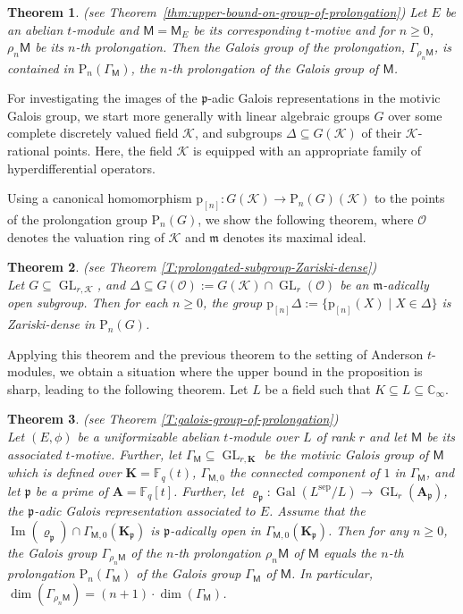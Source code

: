 \documentclass[10pt,a4paper]{amsart}
\theoremstyle{plain} %
\newtheorem{maintheorem}{Theorem}
\theoremstyle{definition}
\theoremstyle{remark}
\newcommand{\CC}{\mathbb{C}}
\newcommand{\FF}{\mathbb{F}}
\newcommand{\cK}{\mathcal{K}}   %
\newcommand{\cO}{\mathcal{O}}   %
\newcommand{\fp}{\mathfrak{p}}  %
\newcommand{\fm}{\mathfrak{m}}  %
\newcommand{\bA}{\mathbf{A}}
\newcommand{\bK}{\mathbf{K}}
\newcommand{\rP}[1]{\mathrm{P}_{\!#1}}
\newcommand{\Fq}{\FF_{\!q}}  %
\newcommand{\Gal}{\operatorname{Gal}}
\newcommand{\GL}{\operatorname{GL}}
\newcommand{\mot}{\mathsf{M}}  %
\newcommand{\image}{\operatorname{Im}}
\newcommand{\prol}[1]{\mathrm{p}_{[#1]}}
\numberwithin{equation}{subsection}
\begin{document}
\begin{maintheorem} (see Theorem~\ref{thm:upper-bound-on-group-of-prolongation}) \label{mainthm:upper-bound}
    Let $E$ be an abelian $t$-module and $\mot=\mot_E$ be its corresponding $t$-motive and for $n \geq 0$, $\rho_n \mot$ be its $n$-th prolongation.
    Then the Galois group of the prolongation, $\Gamma_{\rho_n \mot}$, is contained in $\rP{n}(\Gamma_\mot)$, the $n$-th prolongation of the Galois group of $\mot$.
\end{maintheorem}


For investigating the images of the $\fp$-adic Galois representations in the motivic Galois group, we start more generally with linear algebraic groups $G$ over some complete discretely valued field $\cK$, and subgroups $\Delta\subseteq G(\cK)$ of their $\cK$-rational points. Here, the field $\cK$ is equipped with an appropriate family of hyperdifferential operators.

Using a canonical homomorphism $\prol{n}:G(\cK)\to \rP{n}(G)(\cK)$ to the points of the prolongation group $\rP{n}(G)$, we show the following theorem, where $\cO$ denotes the valuation ring of $\cK$ and $\fm$ denotes its maximal ideal.

\begin{maintheorem}(see Theorem \ref{T:prolongated-subgroup-Zariski-dense})\\ \label{mainthm:Zariski-density}
    Let $G\subseteq \GL_{r,\cK}$, and $\Delta\subseteq G(\cO):=G(\cK)\cap \GL_r(\cO)$ be an $\fm$-adically open subgroup.
	Then for each $n\geq 0$, the group $\prol{n}\Delta:=\{ \prol{n}(X)\mid X\in\Delta \}$ is Zariski-dense in $\rP{n}(G)$.
\end{maintheorem}


Applying this theorem and the previous theorem to the setting of Anderson $t$-modules, we obtain a situation where the upper bound in the proposition is sharp, leading to the following theorem. 
Let $L$ be a field such that $K\subseteq L \subseteq \CC_{\infty}$.


\begin{maintheorem} (see Theorem \ref{T:galois-group-of-prolongation})	\\ \label{mainthm:Galois group of prolongation}
Let $(E,\phi)$ be a uniformizable abelian $t$-module over $L$ of rank $r$ 
and let $\mot$ be its associated $t$-motive. Further, let $\Gamma_\mot\subseteq \GL_{r,\bK}$ be the motivic Galois group of $\mot$ which is defined over $\bK=\Fq(t)$, $\Gamma_{\mot,0}$ the connected component of $1$ in $\Gamma_\mot$, and let
	$\fp$ be a prime of $\bA=\Fq[t]$. Further, let $\varrho_\fp:\Gal(L^\mathrm{sep}/L)\to \GL_r(\bA_\fp)$, the $\fp$-adic Galois representation associated to $E$.
	Assume that the $\image(\varrho_\fp)\cap \Gamma_{\mot,0}(\bK_\fp)$ is $\fp$-adically open in $\Gamma_{\mot,0}(\bK_\fp)$. 
	Then for any $n\geq 0$, the Galois group $\Gamma_{\rho_{n}\mot}$ of the $n$-th prolongation $\rho_{n}\mot$ of $\mot$ equals the $n$-th prolongation $\rP{n}(\Gamma_\mot)$ of the Galois group $\Gamma_{\mot}$ of $\mot$.
	In particular, $\dim(\Gamma_{\rho_{n}\mot})=(n+1)\cdot \dim(\Gamma_\mot)$.
\end{maintheorem}
\end{document}
